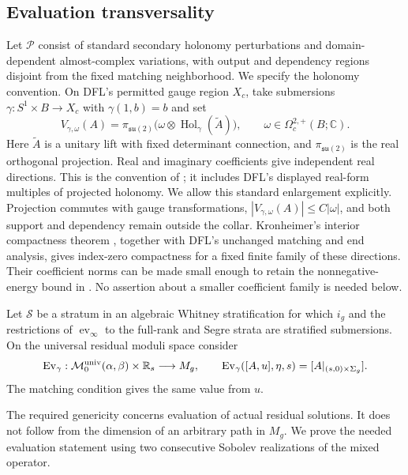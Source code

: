 \documentclass[11pt]{amsart}
\theoremstyle{definition}
\theoremstyle{remark}
\theoremstyle{plain}
\newcommand{\RR}{\mathbb{R}}
\newcommand{\CC}{\mathbb{C}}
\newcommand{\cM}{\mathcal{M}}
\newcommand{\cP}{\mathcal{P}}
\newcommand{\cS}{\mathcal{S}}
\newcommand{\ev}{\operatorname{ev}}
\newcommand{\Ev}{\operatorname{Ev}}
\begin{document}
\subsection{Evaluation transversality}\label{sec:evaluation-transversality}
Let $\cP$ consist of standard secondary holonomy perturbations and
domain-dependent almost-complex variations, with output and dependency
regions disjoint from the fixed matching neighborhood. We specify the
holonomy convention. On DFL's permitted gauge region $X_c$, take
submersions $\gamma:S^1\times B\to X_c$ with $\gamma(1,b)=b$ and set
\begin{equation}\label{eq:matrix-holonomy-directions}
 V_{\gamma,\omega}(A)=
 \pi_{\mathfrak{su}(2)}
 \bigl(\omega\otimes\operatorname{Hol}_\gamma(\widetilde A)\bigr),
 \qquad \omega\in\Omega_c^{2,+}(B;\CC).
\end{equation}
Here $\widetilde A$ is a unitary lift with fixed determinant connection,
and $\pi_{\mathfrak{su}(2)}$ is the real orthogonal projection.
Real and imaginary coefficients give independent real directions.
This is the convention of \cite[Section~3(i)]{Kronheimer05};
it includes DFL's displayed real-form multiples of projected holonomy.
We allow this standard enlargement explicitly. Projection commutes with
gauge transformations, $|V_{\gamma,\omega}(A)|\leq C|\omega|$,
and both support and dependency remain outside the collar.
Kronheimer's interior compactness theorem
\cite[Proposition~11]{Kronheimer05}, together with DFL's unchanged
matching and end analysis, gives index-zero compactness for a fixed
finite family of these directions. Their coefficient norms can be
made small enough to retain the nonnegative-energy bound in
\cite[Section~6.2]{DaeFukLip21a}. No assertion about a smaller
coefficient family is needed below.

Let $\cS$ be a stratum in an algebraic Whitney stratification for which
$i_g$ and the restrictions of $\ev_\infty$ to the full-rank and Segre
strata are stratified submersions.  On the universal residual moduli space
consider
\begin{equation}\label{eq:universal-seam-evaluation}
 \Ev_\gamma:\cM^{\rm univ}_0(\alpha,\beta)\times\RR_s\longrightarrow M_g,
 \qquad
 \Ev_\gamma([A,u],\eta,s)=[A|_{(s,0)\times\Sigma_g}].
\end{equation}
The matching condition gives the same value from $u$.

The required genericity concerns evaluation of actual residual
solutions. It does not follow from the dimension of an arbitrary
path in $M_g$. We prove the needed evaluation statement using two
consecutive Sobolev realizations of the mixed operator.
\end{document}
